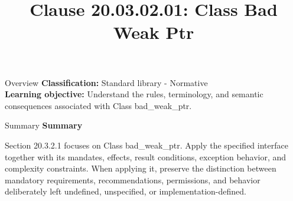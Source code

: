 \documentclass[10pt,letterpaper]{article}
\title{Clause 20.03.02.01: Class Bad Weak Ptr}
\author{}
\date{}
\begin{document}
\maketitle
\begin{CornellOverviewBox}{Overview}
\textbf{Classification:} Standard library - Normative\\[2pt]
\textbf{Learning objective:} Understand the rules, terminology, and semantic consequences associated with Class bad\_weak\_ptr.
\end{CornellOverviewBox}\begin{CornellSummaryBox}{Summary}
{\sffamily\bfseries\color{Accent} Summary}\par\vspace{3pt}Section 20.3.2.1 focuses on Class bad\_weak\_ptr. Apply the specified interface together with its mandates, effects, result conditions, exception behavior, and complexity constraints. When applying it, preserve the distinction between mandatory requirements, recommendations, permissions, and behavior deliberately left undefined, unspecified, or implementation-defined.
\end{CornellSummaryBox}
\end{document}
